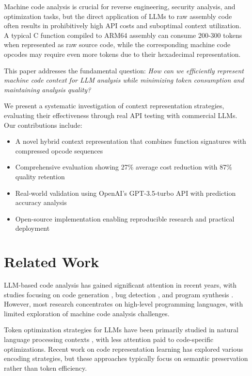 \documentclass[conference]{IEEEtran}
\begin{document}
Machine code analysis is crucial for reverse engineering, security analysis, and optimization tasks, but the direct application of LLMs to raw assembly code often results in prohibitively high API costs and suboptimal context utilization. A typical C function compiled to ARM64 assembly can consume 200-300 tokens when represented as raw source code, while the corresponding machine code opcodes may require even more tokens due to their hexadecimal representation.

This paper addresses the fundamental question: \textit{How can we efficiently represent machine code context for LLM analysis while minimizing token consumption and maintaining analysis quality?}

We present a systematic investigation of context representation strategies, evaluating their effectiveness through real API testing with commercial LLMs. Our contributions include:

\begin{itemize}
\item A novel hybrid context representation that combines function signatures with compressed opcode sequences
\item Comprehensive evaluation showing 27\% average cost reduction with 87\% quality retention
\item Real-world validation using OpenAI's GPT-3.5-turbo API with prediction accuracy analysis
\item Open-source implementation enabling reproducible research and practical deployment
\end{itemize}

\section{Related Work}

LLM-based code analysis has gained significant attention in recent years, with studies focusing on code generation \cite{chen2021evaluating}, bug detection \cite{pearce2022asleep}, and program synthesis \cite{austin2021program}. However, most research concentrates on high-level programming languages, with limited exploration of machine code analysis challenges.

Token optimization strategies for LLMs have been primarily studied in natural language processing contexts \cite{tay2022efficient}, with less attention paid to code-specific optimizations. Recent work on code representation learning \cite{kanade2020learning} has explored various encoding strategies, but these approaches typically focus on semantic preservation rather than token efficiency.
\end{document}
